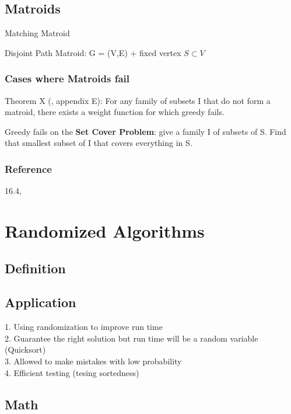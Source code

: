\documentclass[12pt,article]{article}
\begin{document}
\newpage
\subsection{Matroids}
Matching Matroid

Disjoint Path Matroid: G = (V,E) + fixed vertex $S \subset V$

\subsubsection{Cases where Matroids fail}

Theorem X (\cite{JeffE19}, appendix E): For any family of subsets I that do not form a matroid, there exists a weight function for which greedy fails.

Greedy fails on the \textbf{Set Cover Problem}: give a family I of subsets of S. Find that smallest subset of I that covers everything in S. 

\subsubsection{Reference}
16.4, \cite{CLRS}


\newpage
\section{Randomized Algorithms}

\subsection{Definition}

\subsection{Application}
1. Using randomization to improve run time \\
2. Guarantee the right solution but run time will be a random variable (Quicksort) \\
3. Allowed to make mistakes with low probability \\
4. Efficient testing (tesing sortedness)

\subsection{Math}
\end{document}
